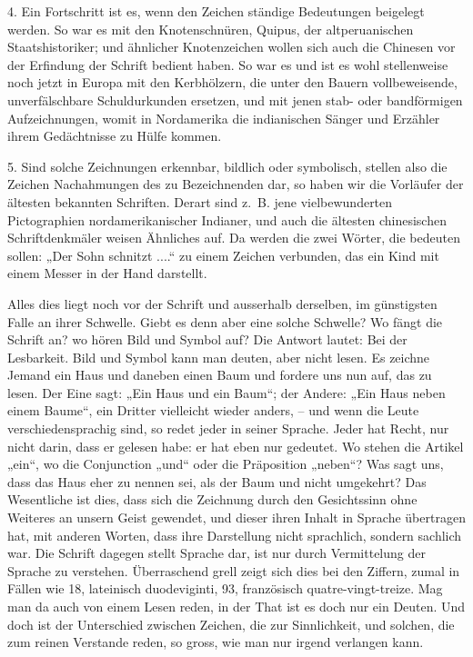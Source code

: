 4. Ein Fortschritt ist es, wenn den Zeichen ständige Bedeutungen beigelegt werden. So war es mit den Knotenschnüren, Quipus, der altperuanischen Staatshistoriker; und ähnlicher Knotenzeichen wollen sich auch die Chinesen vor der Erfindung der Schrift bedient haben. So war es und ist es wohl stellenweise noch jetzt in Europa mit den Kerbhölzern, die unter den Bauern vollbeweisende, unverfälschbare Schuldurkunden ersetzen, und mit jenen stab- oder bandförmigen Aufzeichnungen, womit in Nordamerika die indianischen Sänger und Erzähler ihrem Gedächtnisse zu Hülfe kommen.

5. Sind solche Zeichnungen erkennbar, bildlich oder symbolisch, stellen also die Zeichen Nachahmungen des zu Bezeichnenden dar, so haben wir die Vorläufer der ältesten bekannten Schriften. Derart sind z.~B. jene vielbewunderten Pictographien nordamerikanischer Indianer, und auch die ältesten chinesischen Schriftdenkmäler weisen Ähnliches auf. Da werden die zwei Wörter, die bedeuten sollen: „Der Sohn schnitzt ....“ zu einem Zeichen verbunden, das ein Kind mit einem Messer in der Hand darstellt.

Alles dies liegt noch vor der Schrift und ausserhalb derselben, im günstigsten Falle an ihrer Schwelle. Giebt es denn aber eine solche Schwelle? Wo fängt die Schrift an? wo hören Bild und Symbol auf? Die Antwort lautet: Bei der Lesbarkeit. Bild und Symbol kann man deuten, aber nicht lesen. Es zeichne Jemand ein Haus und daneben einen Baum und fordere uns nun auf, das zu lesen. Der Eine sagt: „Ein Haus und ein Baum“; der Andere: „Ein Haus neben einem Baume“, ein Dritter vielleicht wieder anders, – und wenn die Leute verschiedensprachig sind, so redet jeder in seiner Sprache. Jeder hat Recht, nur nicht darin, dass er gelesen habe: er hat eben nur gedeutet. Wo stehen die Artikel \label{fp.137} „ein“, wo die Conjunction „und“ oder die Präposition „neben“? Was sagt uns, dass das Haus eher zu nennen sei, als der Baum und nicht umgekehrt? Das Wesentliche ist dies, dass sich die Zeichnung durch den Gesichtssinn ohne Weiteres an unsern Geist gewendet, und dieser ihren Inhalt in Sprache übertragen hat, mit anderen Worten, dass ihre Darstellung nicht sprachlich, sondern sachlich war. Die Schrift dagegen stellt Sprache dar, ist nur durch Vermittelung der Sprache zu verstehen. Überraschend grell zeigt sich dies bei den Ziffern, zumal in Fällen wie 18, lateinisch duodeviginti, 93, französisch quatre-vingt-treize. Mag man da auch von einem Lesen reden, in der That ist es doch nur ein Deuten. Und doch ist der Unterschied zwischen Zeichen, die zur Sinnlichkeit, und solchen, die zum reinen Verstande reden, so gross, wie man nur irgend verlangen kann.

